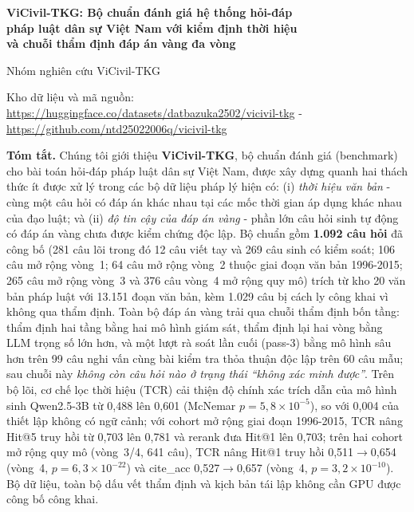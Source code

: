 \documentclass[11pt,a4paper]{article}
\begin{document}
\begin{center}
{\LARGE\bfseries ViCivil-TKG: Bộ chuẩn đánh giá hệ thống hỏi-đáp\\[2pt] pháp luật dân sự Việt Nam với kiểm định thời hiệu\\[2pt] và chuỗi thẩm định đáp án vàng đa vòng\par}
\vspace{6pt}
{\normalsize Nhóm nghiên cứu ViCivil-TKG\par}
\vspace{2pt}
{\small Kho dữ liệu và mã nguồn: \url{https://huggingface.co/datasets/datbazuka2502/vicivil-tkg} - \url{https://github.com/ntd25022006q/vicivil-tkg}\par}
\end{center}

\vspace{4pt}

\noindent\textbf{Tóm tắt.} Chúng tôi giới thiệu \textbf{ViCivil-TKG}, bộ chuẩn đánh giá (benchmark) cho bài toán hỏi-đáp pháp luật dân sự Việt Nam, được xây dựng quanh hai thách thức ít được xử lý trong các bộ dữ liệu pháp lý hiện có: (i) \emph{thời hiệu văn bản} - cùng một câu hỏi có đáp án khác nhau tại các mốc thời gian áp dụng khác nhau của đạo luật; và (ii) \emph{độ tin cậy của đáp án vàng} - phần lớn câu hỏi sinh tự động có đáp án vàng chưa được kiểm chứng độc lập. Bộ chuẩn gồm \textbf{1.092 câu hỏi} đã công bố (281 câu lõi trong đó 12 câu viết tay và 269 câu sinh có kiểm soát; 106 câu mở rộng vòng~1; 64 câu mở rộng vòng~2 thuộc giai đoạn văn bản 1996-2015; 265 câu mở rộng vòng~3 và 376 câu vòng~4 mở rộng quy mô) trích từ kho 20 văn bản pháp luật với 13.151 đoạn văn bản, kèm 1.029 câu bị cách ly công khai vì không qua thẩm định. Toàn bộ đáp án vàng trải qua chuỗi thẩm định bốn tầng: thẩm định hai tầng bằng hai mô hình giám sát, thẩm định lại hai vòng bằng LLM trọng số lớn hơn, và một lượt rà soát lần cuối (pass-3) bằng mô hình sâu hơn trên 99 câu nghi vấn cùng bài kiểm tra thỏa thuận độc lập trên 60 câu mẫu; sau chuỗi này \emph{không còn câu hỏi nào ở trạng thái ``không xác minh được''}. Trên bộ lõi, cơ chế lọc thời hiệu (TCR) cải thiện độ chính xác trích dẫn của mô hình sinh Qwen2.5-3B từ 0,488 lên 0,601 (McNemar $p=5{,}8\times10^{-5}$), so với 0,004 của thiết lập không có ngữ cảnh; với cohort mở rộng giai đoạn 1996-2015, TCR nâng Hit@5 truy hồi từ 0,703 lên 0,781 và rerank đưa Hit@1 lên 0,703; trên hai cohort mở rộng quy mô (vòng~3/4, 641 câu), TCR nâng Hit@1 truy hồi 0,511$\rightarrow$0,654 (vòng~4, $p=6{,}3\times10^{-22}$) và cite\_acc 0,527$\rightarrow$0,657 (vòng~4, $p=3{,}2\times10^{-10}$). Bộ dữ liệu, toàn bộ dấu vết thẩm định và kịch bản tái lập không cần GPU được công bố công khai.
\end{document}
